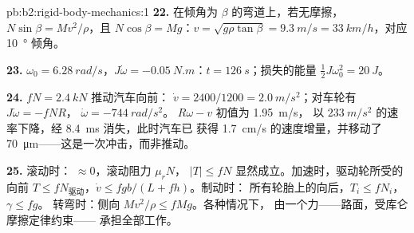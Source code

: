 \begin{solution}{pb:b2:rigid-body-mechanics:1}
\textbf{22.} 在倾角为 $\beta$ 的弯道上，若无摩擦，$N\sin\beta =
Mv^2/\rho$，且 $N\cos\beta = Mg$：$v = \sqrt{g\rho\tan\beta} = \qty{9.3}{m/s} =
\qty{33}{km/h}$，对应 \qty{10}{\degree} 倾角。

\textbf{23.} $\omega_0 = \qty{6.28}{rad/s}$，$J\dot\omega = \qty{-0.05}{N.m}$：$t =
\qty{126}{s}$；损失的能量 $\tfrac12J\omega_0^2 = \qty{20}{J}$。

\textbf{24.}  $fN = \qty{2.4}{kN}$ 推动汽车向前：
$\dot v = 2400/1200 = \qty{2.0}{m/s^2}$；对车轮有 $J\dot\omega = -fNR$，
$\dot\omega = \qty{-744}{rad/s^2}$。 $R\omega - v$ 初值为 \qty{1.95}{m/s}，
以 $\qty{233}{m/s^2}$ 的速率下降，经 \qty{8.4}{ms} 消失，此时汽车已
获得 \qty{1.7}{cm/s} 的速度增量，并移动了 \qty{70}{\micro m}——这是一次冲击，而非推动。

\textbf{25.} 滚动时： $\approx 0$，滚动阻力 $\mu_rN$，
$|T| \le fN$ 显然成立。加速时，驱动轮所受的
向前 $T \le fN_{\text{驱动}}$，$\dot v \le fgb/(L + fh)$。制动时：
所有轮胎上的向后，$T_i \le fN_i$，$\gamma \le fg$。
转弯时：侧向 $Mv^2/\rho \le fMg$。各种情况下，
由一个力——路面，受库仑摩擦定律约束——
承担全部工作。
\end{solution}
